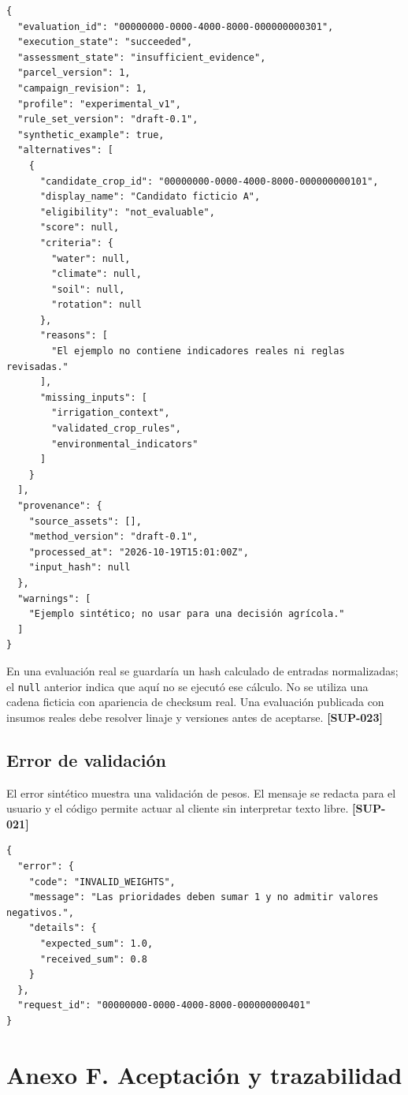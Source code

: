 \documentclass[10pt,a4paper]{article}
\begin{document}
\begin{lstlisting}
{
  "evaluation_id": "00000000-0000-4000-8000-000000000301",
  "execution_state": "succeeded",
  "assessment_state": "insufficient_evidence",
  "parcel_version": 1,
  "campaign_revision": 1,
  "profile": "experimental_v1",
  "rule_set_version": "draft-0.1",
  "synthetic_example": true,
  "alternatives": [
    {
      "candidate_crop_id": "00000000-0000-4000-8000-000000000101",
      "display_name": "Candidato ficticio A",
      "eligibility": "not_evaluable",
      "score": null,
      "criteria": {
        "water": null,
        "climate": null,
        "soil": null,
        "rotation": null
      },
      "reasons": [
        "El ejemplo no contiene indicadores reales ni reglas revisadas."
      ],
      "missing_inputs": [
        "irrigation_context",
        "validated_crop_rules",
        "environmental_indicators"
      ]
    }
  ],
  "provenance": {
    "source_assets": [],
    "method_version": "draft-0.1",
    "processed_at": "2026-10-19T15:01:00Z",
    "input_hash": null
  },
  "warnings": [
    "Ejemplo sintético; no usar para una decisión agrícola."
  ]
}
\end{lstlisting}

En una evaluación real se guardaría un hash calculado de entradas normalizadas; el \texttt{null} anterior indica que aquí no se ejecutó ese cálculo. No se utiliza una cadena ficticia con apariencia de checksum real. Una evaluación publicada con insumos reales debe resolver linaje y versiones antes de aceptarse. \textbf{[SUP-023]}


\subsection{Error de validación}

El error sintético muestra una validación de pesos. El mensaje se redacta para el usuario y el código permite actuar al cliente sin interpretar texto libre. \textbf{[SUP-021]}


\begin{lstlisting}
{
  "error": {
    "code": "INVALID_WEIGHTS",
    "message": "Las prioridades deben sumar 1 y no admitir valores negativos.",
    "details": {
      "expected_sum": 1.0,
      "received_sum": 0.8
    }
  },
  "request_id": "00000000-0000-4000-8000-000000000401"
}
\end{lstlisting}

\clearpage\section{Anexo F. Aceptación y trazabilidad}\label{anexo-f-aceptación-y-trazabilidad}
\end{document}
